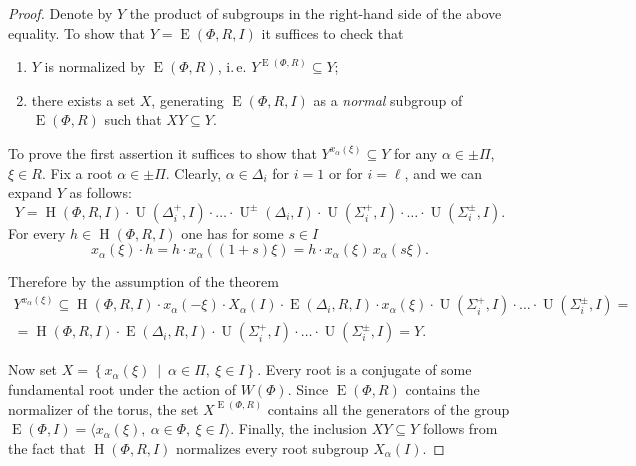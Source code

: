 \documentclass[oneside, 12pt]{amsart}
\theoremstyle{plain}
\numberwithin{equation}{section}
\numberwithin{lemma}{section}
\theoremstyle{definition}
\theoremstyle{remark}
\DeclareMathOperator{\E}{E}
\DeclareMathOperator{\Hh}{H}
\DeclareMathOperator{\U}{U}
\begin{document}
\begin{proof}
Denote by $Y$ the product of subgroups in the right-hand side of the above equality.
To show that $Y=\E(\Phi, R, I)$ it suffices to check that
\begin{enumerate}
\item $Y$ is normalized by $\E(\Phi, R)$, i.\,e. $Y^{\E(\Phi, R)}\subseteq Y$;
\item there exists a set $X$, generating $\E(\Phi, R, I)$ as a \emph{normal} subgroup of $\E(\Phi, R)$ such that $XY\subseteq Y$.
\end{enumerate}
To prove the first assertion it suffices to show that $Y^{x_\alpha(\xi)} \subseteq Y$ for any $\alpha\in \pm \Pi$, $\xi\in R$.
Fix a root $\alpha\in\pm\Pi$. Clearly, $\alpha \in \Delta_i$ for $i=1$ or for $i=\ell$, and we can expand $Y$ as follows:
\[ Y=\Hh(\Phi, R, I) \cdot \U(\Delta_i^+, I) \cdot \ldots \cdot \U^\pm(\Delta_i, I) \cdot \U(\Sigma_i^+, I) \cdot \ldots \cdot \U(\Sigma_i^\pm, I). \]
For every  $h \in \Hh(\Phi, R, I)$ one has for some $s\in I$
\[ x_\alpha(\xi)\cdot h = h\cdot x_\alpha((1+s)\xi)=h\cdot x_\alpha(\xi)\, x_\alpha(s\xi). \]

Therefore by the assumption of the theorem
\begin{multline*}
Y^{x_\alpha(\xi)} \subseteq \Hh(\Phi, R, I) \cdot x_\alpha(-\xi) \cdot X_{\alpha}(I) \cdot \E(\Delta_i, R, I)\cdot x_\alpha(\xi) \cdot \U(\Sigma^+_i, I) \cdot \ldots \cdot \U(\Sigma^\pm_i, I) =\\
= \Hh(\Phi, R, I) \cdot \E(\Delta_i, R, I) \cdot \U(\Sigma^+_i, I) \cdot \ldots \cdot \U(\Sigma^\pm_i, I) = Y.
\end{multline*}

Now set $X=\left\{x_\alpha(\xi)\ \middle|\ \alpha\in\Pi, \ \xi\in I \right\}$. 
Every root is a conjugate of some fundamental root under the action of $W(\Phi)$.
Since $\E(\Phi, R)$ contains the normalizer of the torus, the set $X^{\E(\Phi, R)}$ contains all the generators of the group $\E(\Phi, I) = \langle x_\alpha(\xi), \  \alpha\in\Phi, \ \xi\in I \rangle$.
Finally, the inclusion $XY \subseteq Y$ follows from the fact that $\Hh(\Phi, R, I)$ normalizes every root subgroup $X_\alpha(I)$.
\end{proof}
\end{document}
